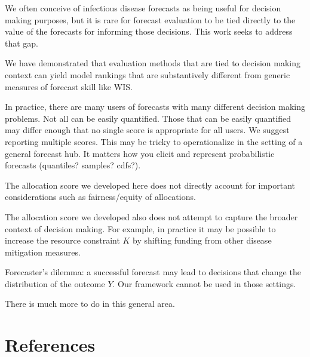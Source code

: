 \documentclass{article}
\begin{document}
We often conceive of infectious disease forecasts as being useful for decision making purposes, but it is rare for forecast evaluation to be tied directly to the value of the forecasts for informing those decisions. This work seeks to address that gap.

We have demonstrated that evaluation methods that are tied to decision making context can yield model rankings that are substantively different from generic measures of forecast skill like WIS.

In practice, there are many users of forecasts with many different decision making problems. Not all can be easily quantified. Those that can be easily quantified may differ enough that no single score is appropriate for all users. We suggest reporting multiple scores. This may be tricky to operationalize in the setting of a general forecast hub. It matters how you elicit and represent probabilistic forecasts (quantiles? samples? cdfs?).

The allocation score we developed here does not directly account for important considerations such as fairness/equity of allocations.

The allocation score we developed also does not attempt to capture the broader context of decision making. For example, in practice it may be possible to increase the resource constraint $K$ by shifting funding from other disease mitigation measures.

Forecaster's dilemma: a successful forecast may lead to decisions that change the distribution of the outcome $Y$. Our framework cannot be used in those settings.

There is much more to do in this general area.

\section{References}


\end{document}
